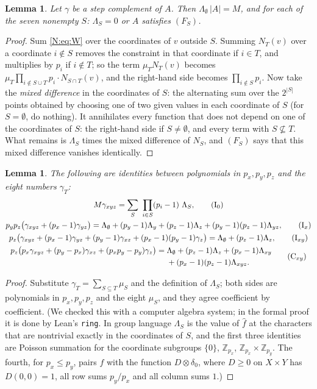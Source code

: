 \documentclass[11pt,a4paper]{amsart}
\newtheorem{lemma}[theorem]{Lemma}
\theoremstyle{definition}
\theoremstyle{remark}
\newcommand{\Z}{\mathbb{Z}}
\begin{document}
\begin{lemma}\label{N:lem:dich}
Let $\gamma$ be a step complement of $A$. Then $\Lambda_\emptyset\,|A|=M$, and for each of the seven nonempty $S$:
$\Lambda_S=0$ or $A$ satisfies $(F_S)$.
\end{lemma}
\begin{proof}
Sum \eqref{N:eq:W} over the coordinates of $v$ outside $S$. Summing $N_T(v)$ over a coordinate $i\notin S$ removes
the constraint in that coordinate if $i\in T$, and multiplies by $p_i$ if $i\notin T$; so the term $\mu_TN_T(v)$
becomes $\mu_T\prod_{i\notin S\cup T}p_i\cdot N_{S\cap T}(v)$, and the right-hand side becomes
$\prod_{i\notin S}p_i$. Now take the \emph{mixed difference} in the coordinates of $S$: the alternating sum over
the $2^{|S|}$ points obtained by choosing one of two given values in each coordinate of $S$ (for $S=\emptyset$, do
nothing). It annihilates every function that does not depend on one of the coordinates of $S$: the right-hand
side if $S\ne\emptyset$, and every term with $S\not\subseteq T$. What remains is $\Lambda_S$ times the mixed
difference of $N_S$, and $(F_S)$ says that this mixed difference vanishes identically.
\end{proof}

\begin{lemma}\label{N:lem:ident}
The following are identities between polynomials in $p_x,p_y,p_z$ and the eight numbers $\gamma_T$:
\begin{gather*}
 M\gamma_{xyz}=\sum_{S}\ \prod_{i\in S}(p_i-1)\ \Lambda_S, \tag{I$_0$}\\
 p_yp_z\bigl(\gamma_{xyz}+(p_x-1)\gamma_{yz}\bigr)=\Lambda_\emptyset+(p_y-1)\Lambda_y+(p_z-1)\Lambda_z
   +(p_y-1)(p_z-1)\Lambda_{yz}, \tag{I$_x$}\\
 p_z\bigl(\gamma_{xyz}+(p_x-1)\gamma_{yz}+(p_y-1)\gamma_{xz}+(p_x-1)(p_y-1)\gamma_{z}\bigr)
   =\Lambda_\emptyset+(p_z-1)\Lambda_z, \tag{I$_{xy}$}\\
 \begin{aligned}
 p_z\bigl(p_x\gamma_{xyz}+(p_y-p_x)\gamma_{xz}+(p_xp_y-p_y)\gamma_{z}\bigr)
   ={}&\Lambda_\emptyset+(p_z-1)\Lambda_z+(p_x-1)\Lambda_{xy}\\
   &{}+(p_x-1)(p_z-1)\Lambda_{xyz}.
 \end{aligned} \tag{C$_{xy}$}
\end{gather*}
\end{lemma}
\begin{proof}
Substitute $\gamma_T=\sum_{S\subseteq T}\mu_S$ and the definition of $\Lambda_S$; both sides are polynomials in
$p_x,p_y,p_z$ and the eight $\mu_S$, and they agree coefficient by coefficient. (We checked this with a computer
algebra system; in the formal proof it is done by Lean's \texttt{ring}. In group language $\Lambda_S$ is the
value of $\hat f$ at the characters that are nontrivial exactly in the coordinates of $S$, and the first three
identities are Poisson summation for the coordinate subgroups $\{0\}$, $\Z_{p_x}$, $\Z_{p_x}\times\Z_{p_y}$. The
fourth, for $p_x\le p_y$, pairs $f$ with the function $D\otimes\delta_0$, where $D\ge 0$ on $X\times Y$ has
$D(0,0)=1$, all row sums $p_y/p_x$ and all column sums $1$.)
\end{proof}
\end{document}
